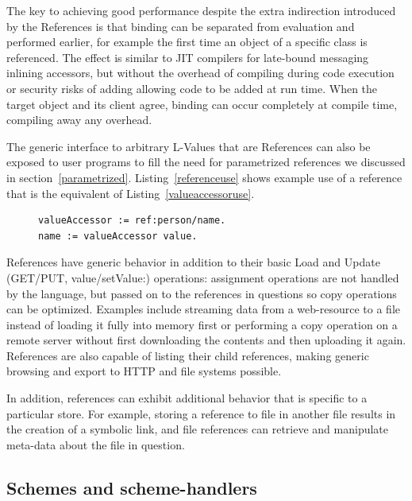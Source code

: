 \documentclass[preprint]{sigplanconf}
\begin{document}
The key to achieving good performance despite the extra indirection introduced
by the References is that binding can be separated from evaluation and performed
earlier, for example the first time an object of a specific class is referenced.  
The effect is similar to JIT compilers for late-bound
messaging inlining accessors, but without the overhead of compiling during
code execution or security risks of adding allowing code to be added at run time.
When the target object and its client agree, binding can occur completely at 
compile time, compiling away any overhead.

The generic interface to arbitrary L-Values that are References can also be 
exposed to user programs to fill the need for parametrized references we
discussed in section~\ref{parametrized}.  Listing~\ref{referenceuse} shows
example use of a reference that is the equivalent of Listing~\ref{valueaccessoruse}.

\begin{figure}[htbp]
\begin{lstlisting}[style=numbers,label=referenceuse,caption=Using a first class reference]
valueAccessor := ref:person/name.
name := valueAccessor value.
\end{lstlisting}
\end{figure}

References have generic behavior in addition to their basic 
Load and Update (GET/PUT, value/setValue:) operations:   assignment operations
are not handled by the language, but passed on to the references in questions
so copy operations can be optimized.   Examples include streaming data from
a web-resource to a file instead of loading it fully into memory first or performing
a copy operation on a remote server without first downloading the contents
and then uploading it again. References
are also capable of listing their child references, making generic browsing and
export to HTTP and file systems possible.

In addition, references can exhibit additional behavior that is specific to a particular
store.  For example, storing a reference to file in another file results in the creation
of a symbolic link, and file references can retrieve and manipulate meta-data about
the file in question.



\subsection{Schemes and scheme-handlers}
\label{schemes}
\end{document}
